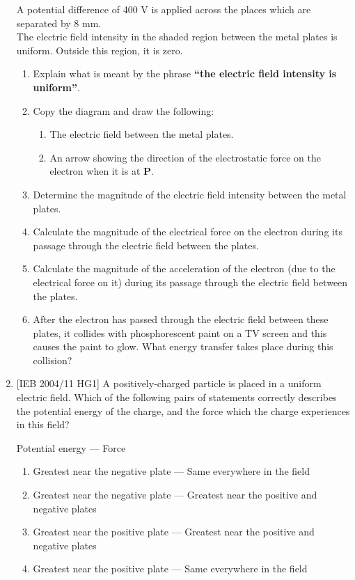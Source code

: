 \begin{enumerate}
{A potential difference of 400 V is applied across the places which are separated by 8 mm.\\

The electric field intensity in the shaded region between the
metal plates is uniform. Outside this region, it is zero.

\begin{enumerate}
\item{Explain what is meant by the phrase \textbf{``the electric field intensity is uniform''}.}
\item{Copy the diagram and draw the following:
\begin{enumerate}
\item{The electric field between the metal plates.}
\item{An arrow showing the direction of the electrostatic force on the electron when it is at \textbf{P}.}
\end{enumerate}
}
\item{Determine the magnitude of the electric field intensity between the metal plates.}

\item{Calculate the magnitude of the electrical force on the electron during its passage through the electric field between the plates.}

\item{Calculate the magnitude of the acceleration of the electron (due to the electrical force on it) during its passage through the electric field between the plates.}

\item{After the electron has passed through the electric field between these plates, it collides with phosphorescent paint on a TV screen and this causes the paint to glow. What energy transfer takes place during this collision?}
\end{enumerate}}

\item{[IEB 2004/11 HG1] A positively-charged particle is placed in a uniform electric field. Which of the following pairs of statements correctly describes the potential energy of the charge, and the force which the charge experiences in this field?

Potential energy --- Force
\begin{enumerate}
\item{Greatest near the negative plate --- Same everywhere in the field}
\item{Greatest near the negative plate --- Greatest near the positive and negative plates}
\item{Greatest near the positive plate --- Greatest near the positive and negative plates}
\item{Greatest near the positive plate --- Same everywhere in the field}
\end{enumerate}
}


\end{enumerate}
